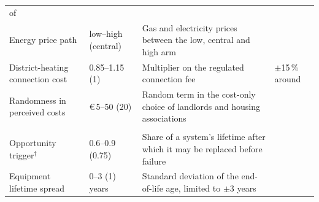 \documentclass[preprint,12pt,authoryear]{elsarticle}
\begin{document}
\begin{table}[htbp]
\begin{tabularx}{\linewidth}{@{}L{3.3cm}L{2.0cm}
      >{\RaggedRight\arraybackslash}XL{3.1cm}@{}}
      of \citet{cedelftUpdateKentallenInstallaties2023}\\
    Energy price path & low--high (central) & Gas and electricity prices
      between the low, central and high arm & \citet{pbl_kev_2025}\\
    District-heating connection cost & 0.85--1.15 (1) & Multiplier on the
      regulated connection fee & $\pm$15\,\% around
      \citet{marktTarievenWarmteKoude}\\
    Randomness in perceived costs & \euro\,5--50 (20) & Random term in the
      cost-only choice of landlords and housing associations & \\
    \addlinespace
    \\
    Opportunity trigger$^\dagger$ & 0.6--0.9 (0.75) & Share of a system's
      lifetime after which it may be replaced before failure & \\
    Equipment lifetime spread & 0--3 (1) years & Standard deviation of the
      end-of-life age, limited to $\pm$3 years & \\
    \bottomrule
  \end{tabularx}
\end{table}
\end{document}

